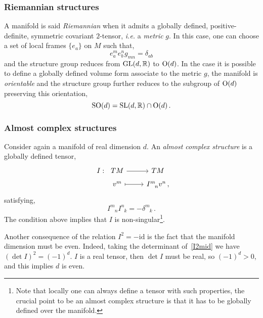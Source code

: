 \documentclass[debug]{phd}
\begin{document}
					\subsubsection{Riemannian structures}
						A manifold is said \emph{Riemannian} when it admits a globally defined, positive-definite, symmetric covariant $2$-tensor, \emph{i.e.} a \emph{metric} $g$.
						In this case, one can choose a set of local frames $\{e_a\}$ on $M$ such that,
								\begin{equation}
									e_a^m e_b^n g_{mn} = \delta_{ab}
								\end{equation}
						and the structure group reduces from $\mathrm{GL}(d,\mathbb{R})$ to $\mathrm{O}(d)$.
						In the case it is possible to define a globally defined volume form associate to the metric $g$, the manifold is \emph{orientable} and the structure group further reduces to the subgroup of $\mathrm{O}(d)$ preserving this orientation,
								\begin{equation}
									\mathrm{SO}(d) = \mathrm{SL}(d,\mathbb{R}) \cap \mathrm{O}(d)\, .
								\end{equation}
					\subsubsection{Almost complex structures}
						Consider again a manifold of real dimension $d$. 
						An \emph{almost complex structure} is a globally defined tensor,
								\begin{equation}
									\begin{tikzcd}[row sep=tiny]
										I :\!\!\!\!\!\!\!\!\!\!\!\!\!\!\!\!\! & TM \arrow{r} & TM \\
 											& v^m \arrow[mapsto]{r} & I^m_{\phantom{m}n} v^n \, ,
									\end{tikzcd}
								\end{equation}
						satisfying,
								\begin{equation}
								\label{I2mid}
									I^m_{\phantom{m}n} I^n_{\phantom{n}k} = - \delta^m_{\phantom{m}k}\, .
								\end{equation}
						The condition above implies that $I$ is non-singular\footnote{%
							Note that locally one can always define a tensor with such properties, the crucial point to be an almost complex structure is that it has to be globally defined over the manifold.%
							}.
						
						Another consequence of the relation $I^2 = - \mathrm{id}$ is the fact that the manifold dimension must be even.
						Indeed, taking the determinant of~\eqref{I2mid} we have $(\det I)^2 = (-1)^d$. 
						$I$ is a real tensor, then $\det I$ must be real, so $(-1)^d > 0$, and this implies $d$ is even.
						
\end{document}
